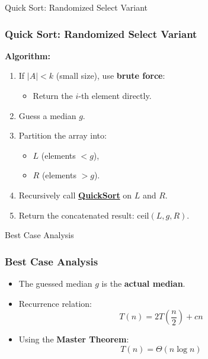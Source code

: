 \begin{frame}{Quick Sort: Randomized Select Variant}
\frametitle{Quick Sort: Randomized Select Variant}
\textbf{Algorithm:}
\begin{enumerate}
    \item If \( |A| < k \) (small size), use \textbf{brute force}:
        \begin{itemize}
            \item Return the \( i \)-th element directly.
        \end{itemize}
    \item Guess a median \( g \).
    \item Partition the array into:
        \begin{itemize}
            \item \( L \) (elements \( < g \)),
            \item \( R \) (elements \( > g \)).
        \end{itemize}
\item Recursively call \textbf{\textcolor{blue}{\href{https://drive.google.com/file/d/1-il0i8t0XW9ubEFkQk3HtQUox8EorSX-/view}{QuickSort}}} on \( L \) and \( R \).
\item Return the concatenated result: \( \text{ceil}(L, g, R) \).
\end{enumerate}

\end{frame}


\begin{frame}{Best Case Analysis}
\frametitle{Best Case Analysis}
\begin{itemize}
    \item The guessed median \( g \) is the \textbf{actual median}.
    \item Recurrence relation:
        \[
        T(n) = 2T\left(\frac{n}{2}\right) + cn
        \]
    \item Using the \textbf{Master Theorem}:
        \[
        T(n) = \Theta(n \log n)
        \]
\end{itemize}
\end{frame}


